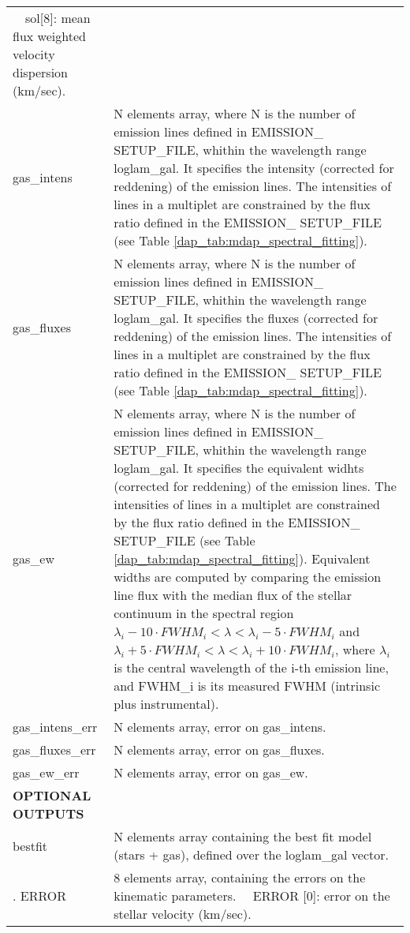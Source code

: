 \begin{center}
\begin{longtable}{p{2.7cm}| p{11.1cm}}
       \ \ sol[8]: mean flux weighted velocity dispersion (km/sec).  \\
%
gas\_intens &  N elements array, where N is the number of emission lines defined in EMISSION\_ SETUP\_FILE, 
                 whithin the wavelength range loglam\_gal. It specifies the intensity (corrected for reddening) 
                 of the emission lines. The intensities of lines in a multiplet are constrained by the flux ratio 
                 defined in the EMISSION\_ SETUP\_FILE (see Table \ref{dap_tab:mdap_spectral_fitting}). \\
%
gas\_fluxes & N elements array, where N is the number of emission lines defined in EMISSION\_ SETUP\_FILE, 
                 whithin the wavelength range loglam\_gal. It specifies the fluxes  (corrected for reddening) 
                 of the emission lines. The intensities of lines in a multiplet are constrained by the flux ratio 
                 defined in the EMISSION\_ SETUP\_FILE (see Table \ref{dap_tab:mdap_spectral_fitting}). \\
%
gas\_ew & N elements array, where N is the number of emission lines defined in EMISSION\_ SETUP\_FILE, 
                 whithin the wavelength range loglam\_gal. It specifies the equivalent widhts (corrected for reddening) 
                 of the emission lines. The intensities of lines in a multiplet are constrained by the flux ratio 
                 defined in the EMISSION\_ SETUP\_FILE (see Table \ref{dap_tab:mdap_spectral_fitting}). Equivalent widths 
                 are computed by comparing the emission line flux with the median flux of the stellar 
                 continuum in the spectral region  $\lambda_{i} - 10 \cdot FWHM_i < \lambda < \lambda_{i} - 5 \cdot FWHM_i $ and 
                 $\lambda_{i} +5 \cdot FWHM_i < \lambda < \lambda_{i} +10 \cdot FWHM_i $, where $\lambda_{i}$ is the central wavelength 
                  of the i-th emission line, and FWHM\_i is its measured FWHM (intrinsic plus instrumental). \\
%
gas\_intens\_err  & N elements array, error on gas\_intens. \\ 
%
gas\_fluxes\_err  & N elements array, error on gas\_fluxes. \\
%
gas\_ew\_err &N elements array, error on gas\_ew. \\
%
\hline
{\bf  OPTIONAL OUTPUTS} &  \\
\hline
bestfit   &   N elements array containing the best fit model (stars + gas), defined over the loglam\_gal vector. \\.
%
ERROR   & 8 elements array, containing the errors on the kinematic parameters.
       \ \ ERROR [0]: error on the stellar velocity (km/sec).


\end{longtable}
\end{center}
